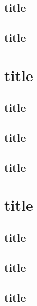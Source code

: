 \documentclass[british,french,11pt, a4paper, openany]{article}
\begin{document}
\subsection{title}
\subsection{title}


\section{title}
\subsection{title}
\subsection{title}
\subsection{title}


\section{title}
\subsection{title}
\subsection{title}
\subsection{title}
\end{document}
